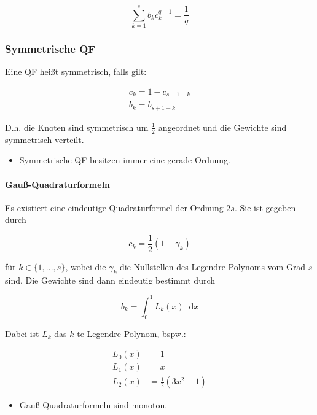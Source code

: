 \documentclass[a4paper, 14pt]{article}
\newcommand*\diff{\mathop{}\!\mathrm{d}}
\begin{document}
	\begin{equation}
		\sum_{k = 1}^{s}{b_k c_k^{q - 1}} = \frac{1}{q}
	\end{equation}

	\subsubsection{Symmetrische QF}

	Eine QF heißt symmetrisch, falls gilt:

	\begin{eqnarray}
		c_k = 1 - c_{s + 1 - k} \\
		b_k = b_{s + 1 - k}
	\end{eqnarray}

	D.h. die Knoten sind symmetrisch um $\frac{1}{2}$ angeordnet und die Gewichte sind symmetrisch verteilt.

	\begin{itemize}
		\item Symmetrische QF besitzen immer eine gerade Ordnung.
	\end{itemize}

	\paragraph{Gauß-Quadraturformeln}

	Es existiert eine eindeutige Quadraturformel der Ordnung $2s$.
	Sie ist gegeben durch

	\begin{equation}
		c_k = \frac{1}{2}(1 + \gamma_k)
	\end{equation}

	für $k \in \{1, ..., s\}$, wobei die $\gamma_k$ die Nullstellen des Legendre-Polynoms vom Grad $s$ sind.
	Die Gewichte sind dann eindeutig bestimmt durch

	\begin{equation}
		b_k = \int_0^1{L_k(x) \diff x}
	\end{equation}

	Dabei ist $L_k$ das $k$-te \href{https://de.wikipedia.org/wiki/Legendre-Polynom}{Legendre-Polynom}, bspw.:

	\begin{align}
		L_0(x) & = 1 \\
		L_1(x) & = x \\
		L_2(x) & = \frac{1}{2}(3x^2 - 1)
	\end{align}

	\begin{itemize}
		\item Gauß-Quadraturformeln sind monoton.
	\end{itemize}
\end{document}
